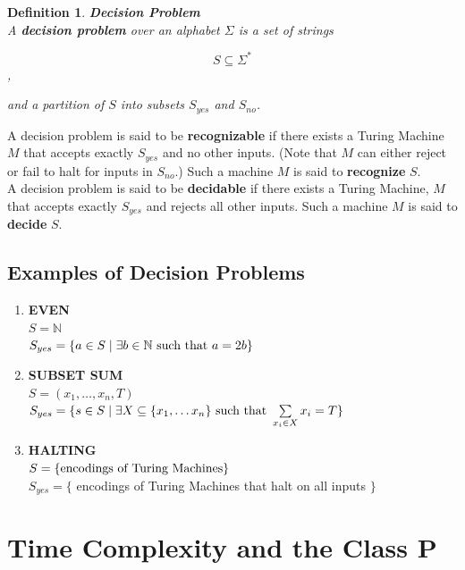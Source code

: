 \documentclass{article}
\newtheorem{definition}{Definition}[section]
\renewcommand{\suchthat}[0]{\textnormal{ such that }}
\begin{document}
\begin{definition}{\textbf{Decision Problem}}\\
  
  A \textbf{decision problem} over an alphabet $\Sigma$ is a set of
  strings

  $$S \subseteq \Sigma^*$$,

  and a partition of $S$ into subsets $S_{yes}$ and $S_{no}$.\\
\end{definition}

A decision problem is said to be \textbf{recognizable} if there
exists a Turing Machine $M$ that accepts exactly $S_{yes}$ and no
other inputs. (Note that $M$ can either reject or fail to halt for
inputs in $S_{no}$.)  Such a machine $M$ is said to
\textbf{recognize} $S$.
\\

A decision problem is said to be \textbf{decidable} if there exists
a Turing Machine, $M$ that accepts exactly $S_{yes}$ and rejects all
other inputs. Such a machine $M$ is said to \textbf{decide} $S$.

\subsection*{Examples of Decision Problems}

\begin{enumerate}

\item \textbf{EVEN}\\
  $S = \mathbb{N}$\\
  $S_{yes} = \set{a \in S \mid \exists b \in \mathbb{N}$$\suchthat a = 2b}$

\item \textbf{SUBSET SUM}\\
  $S = (x_1, \ldots, x_n, T)$\\
  $S_{yes} = \set{s \in S \mid \exists X \subseteq \set{x_1, \ldots
      x_n} \suchthat \sum\limits_{x_i \in X}x_i = T}$

\item \textbf{HALTING}\\
  $S = \{\textnormal{encodings of Turing Machines}\}$\\
  $S_{yes} = \{$ encodings of Turing Machines that halt on all inputs $\}$
\end{enumerate}

\section{Time Complexity and the Class P}
\end{document}
